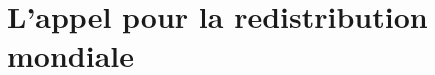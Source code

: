\documentclass[a5paper,french,openany]{memoir}
\begin{document}



\chapter{L'appel pour la redistribution mondiale\label{ch:appel}}
\end{document}
